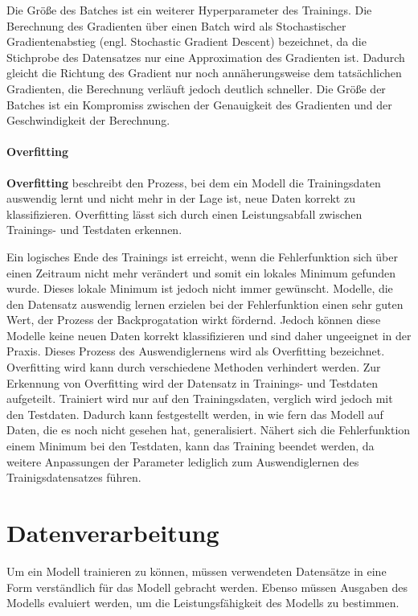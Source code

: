 Die Größe des Batches ist ein weiterer Hyperparameter des Trainings.
Die Berechnung des Gradienten über einen Batch wird als Stochastischer Gradientenabstieg (engl. Stochastic Gradient Descent) bezeichnet, da die Stichprobe des Datensatzes nur eine Approximation des Gradienten ist.
Dadurch gleicht die Richtung des Gradient nur noch annäherungsweise dem tatsächlichen Gradienten, die Berechnung verläuft jedoch deutlich schneller.
Die Größe der Batches ist ein Kompromiss zwischen der Genauigkeit des Gradienten und der Geschwindigkeit der Berechnung.\\

\paragraph{Overfitting}
\begin{definition}\label{def:overfitting}
    \textbf{Overfitting} beschreibt den Prozess, bei dem ein Modell die Trainingsdaten auswendig lernt und nicht mehr in der Lage ist,
    neue Daten korrekt zu klassifizieren. Overfitting lässt sich durch einen Leistungsabfall zwischen Trainings- und Testdaten erkennen.
\end{definition}

Ein logisches Ende des Trainings ist erreicht, wenn die Fehlerfunktion sich über einen Zeitraum nicht mehr verändert und somit ein lokales Minimum gefunden wurde.
Dieses lokale Minimum ist jedoch nicht immer gewünscht.
Modelle, die den Datensatz auswendig lernen erzielen bei der Fehlerfunktion einen sehr guten Wert, der Prozess der Backprogatation wirkt fördernd.
Jedoch können diese Modelle keine neuen Daten korrekt klassifizieren und sind daher ungeeignet in der Praxis. Dieses Prozess des Auswendiglernens wird als Overfitting bezeichnet.\\

Overfitting wird kann durch verschiedene Methoden verhindert werden.
Zur Erkennung von Overfitting wird der Datensatz in Trainings- und Testdaten aufgeteilt.
Trainiert wird nur auf den Trainingsdaten, verglich wird jedoch mit den Testdaten.
Dadurch kann festgestellt werden, in wie fern das Modell auf Daten, die es noch nicht gesehen hat, generalisiert.
Nähert sich die Fehlerfunktion einem Minimum bei den Testdaten, kann das Training beendet werden, da weitere Anpassungen der Parameter lediglich zum Auswendiglernen des Trainigsdatensatzes führen.\\


\section{Datenverarbeitung}\label{sec:datenverarbeitung}
Um ein Modell trainieren zu können, müssen verwendeten Datensätze in eine Form verständlich für das Modell gebracht werden. Ebenso müssen Ausgaben des Modells evaluiert werden, um die Leistungsfähigkeit des Modells zu bestimmen.\\

